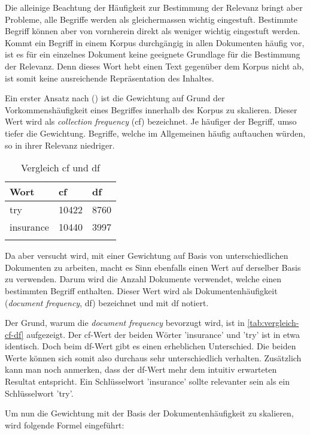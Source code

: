 Die alleinige Beachtung der Häufigkeit zur Bestimmung der Relevanz bringt aber Probleme, alle Begriffe werden als gleichermassen wichtig eingestuft. Bestimmte Begriff können aber von vornherein direkt als weniger wichtig eingestuft werden. Kommt ein Begriff in einem Korpus durchgängig in allen Dokumenten häufig vor, ist es für ein einzelnes Dokument keine geeignete Grundlage für die Bestimmung der Relevanz. Denn dieses Wort hebt einen Text gegenüber dem Korpus nicht ab, ist somit keine ausreichende Repräsentation des Inhaltes.

Ein erster Ansatz nach (\cite{manning2008introduction}) ist die Gewichtung auf Grund der Vorkommenshäufigkeit eines Begriffes innerhalb des Korpus zu skalieren. Dieser Wert wird als \textit{collection frequency} (cf) bezeichnet. Je häuf\-iger der Begriff, umso tiefer die Gewichtung. Begriffe, welche im Allgemeinen häufig auftauchen würden, so in ihrer Relevanz niedriger. 

\begin{longtable}{|p{2cm}| p{1.2cm} | p{1cm}|}
  \hline
    Wort & cf & df \\\hline
    try & 10422 & 8760 \\\hline
    insurance & 10440 & 3997 \\\hline
    \caption{Vergleich cf und df \protect\footnotemark
    }
  \label{tab:vergleich-cf-df}
\end{longtable}


Da aber versucht wird, mit einer Gewichtung auf Basis von unterschiedlichen Dokumenten zu arbeiten, macht es Sinn ebenfalls einen Wert auf derselber Basis zu verwenden. Darum wird die Anzahl Dokumente verwendet, welche einen bestimmten Begriff enthalten. Dieser Wert wird als Dokumentenhäufigkeit (\textit{document frequency}, df) bezeichnet und mit $\text{df}$ notiert.

Der Grund, warum die \textit{document frequency} bevorzugt wird, ist in \autoref{tab:vergleich-cf-df} aufgezeigt. Der cf-Wert der beiden Wörter 'insurance' und 'try' ist in etwa identisch. Doch beim df-Wert gibt es einen erheblichen Unterschied. Die beiden Werte können sich somit also durchaus sehr unterschiedlich verhalten. Zusätzlich kann man noch anmerken, dass der df-Wert mehr dem intuitiv erwarteten Resultat entspricht. Ein Schlüsselwort 'insurance' sollte relevanter sein als ein Schlüsselwort 'try'.

Um nun die Gewichtung mit der Basis der Dokumentenhäufigkeit zu skalieren, wird folgende Formel eingeführt:

